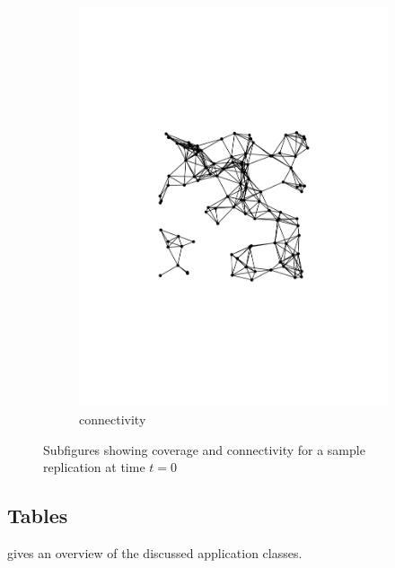 \begin{figure}
\begin{subfigure}{0.3\textwidth}
      \includegraphics[width=\textwidth]{figures/connectivity-50-0-static1}
      \caption{connectivity}\label{fig:setup2}
    \end{subfigure}
	\caption{Subfigures showing coverage and connectivity for a sample replication at time $t=0$}%
	\label{fig:setups12}%
\end{figure}

\subsection{Tables}

 gives an overview of the discussed application classes.

